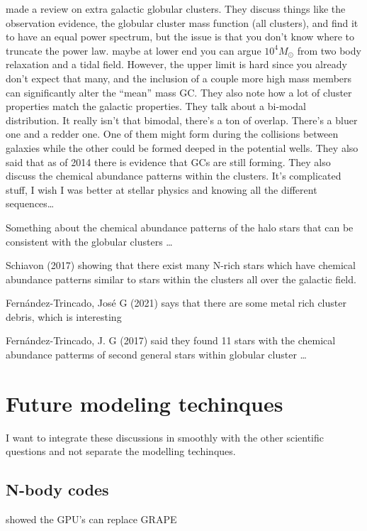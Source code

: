     
        \citet{2006ARA&A..44..193B} made a review on extra galactic globular clusters. They discuss things like the observation evidence, the globular cluster mass function (all clusters), and find it to have an equal power spectrum, but the issue is that you don't know where to truncate the power law. maybe at lower end you can argue $10^4 M_\odot$ from two body relaxation and a tidal field. However, the upper limit is hard since you already don't expect that many, and the inclusion of a couple more high mass members can significantly alter the ``mean'' mass GC. They also note how a lot of cluster properties match the galactic properties. They talk about a bi-modal distribution. It really isn't that bimodal, there's a ton of overlap. There's a bluer one and a redder one. One of them might form during the collisions between galaxies while the other could be formed deeped in the potential wells. They also said that as of 2014 there is evidence that GCs are still forming. They also discuss the chemical abundance patterns within the clusters. It's complicated stuff, I wish I was better at stellar physics and knowing all the different sequences\dots


        Something about the chemical abundance patterns of the halo stars that can be consistent with the globular clusters \dots

        Schiavon (2017) showing that there exist many N-rich stars which have chemical abundance patterns similar to stars within the clusters all over the galactic field. 

        Fernández-Trincado, José G (2021) says that there are some metal rich cluster debris, which is interesting 

        Fernández-Trincado, J. G (2017) said they found 11 stars with the chemical abundance patterms of second general stars within globular cluster \dots 

\section{Future modeling techinques}


    I want to integrate these discussions in smoothly with the other scientific questions and not separate the modelling techinques. 

    \subsection{N-body codes}
    \citep{2012MNRAS.424..545N} showed the GPU's can replace GRAPE

